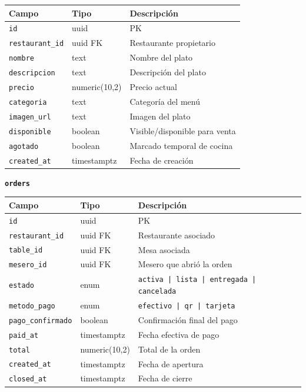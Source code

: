 \begin{tabular}{lll}
  \toprule
  \textbf{Campo} & \textbf{Tipo} & \textbf{Descripción} \\
  \midrule
  \texttt{id} & uuid & PK \\
  \texttt{restaurant\_id} & uuid FK & Restaurante propietario \\
  \texttt{nombre} & text & Nombre del plato \\
  \texttt{descripcion} & text & Descripción del plato \\
  \texttt{precio} & numeric(10,2) & Precio actual \\
  \texttt{categoria} & text & Categoría del menú \\
  \texttt{imagen\_url} & text & Imagen del plato \\
  \texttt{disponible} & boolean & Visible/disponible para venta \\
  \texttt{agotado} & boolean & Marcado temporal de cocina \\
  \texttt{created\_at} & timestamptz & Fecha de creación \\
  \bottomrule
\end{tabular}

\vspace{8pt}
\noindent\textbf{\texttt{orders}}

\begin{tabular}{lll}
  \toprule
  \textbf{Campo} & \textbf{Tipo} & \textbf{Descripción} \\
  \midrule
  \texttt{id} & uuid & PK \\
  \texttt{restaurant\_id} & uuid FK & Restaurante asociado \\
  \texttt{table\_id} & uuid FK & Mesa asociada \\
  \texttt{mesero\_id} & uuid FK & Mesero que abrió la orden \\
  \texttt{estado} & enum & \texttt{activa | lista | entregada | cancelada} \\
  \texttt{metodo\_pago} & enum & \texttt{efectivo | qr | tarjeta} \\
  \texttt{pago\_confirmado} & boolean & Confirmación final del pago \\
  \texttt{paid\_at} & timestamptz & Fecha efectiva de pago \\
  \texttt{total} & numeric(10,2) & Total de la orden \\
  \texttt{created\_at} & timestamptz & Fecha de apertura \\
  \texttt{closed\_at} & timestamptz & Fecha de cierre \\
  \bottomrule
\end{tabular}

